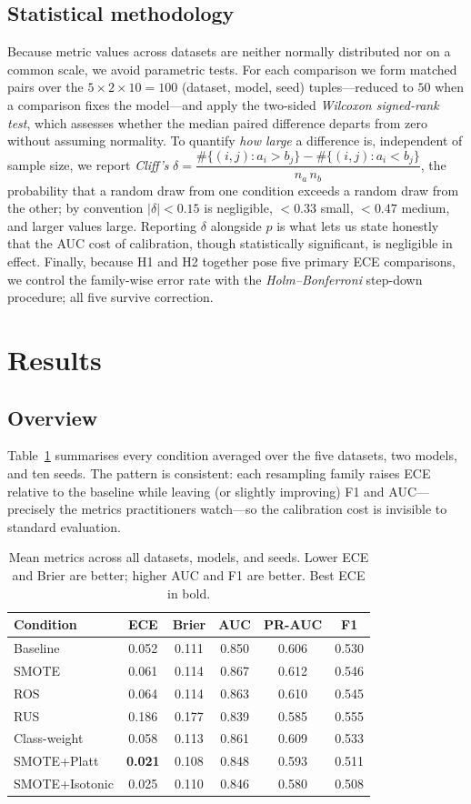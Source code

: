 \documentclass[conference]{IEEEtran}
\begin{document}
\subsection{Statistical methodology}
Because metric values across datasets are neither normally distributed
nor on a common scale, we avoid parametric tests. For each comparison we
form matched pairs over the $5\times2\times10=100$ (dataset, model, seed)
tuples---reduced to $50$ when a comparison fixes the model---and apply the
two-sided \emph{Wilcoxon signed-rank test}, which assesses whether the
median paired difference departs from zero without assuming normality. To
quantify \emph{how large} a difference is, independent of sample size, we
report \emph{Cliff's} $\delta=\dfrac{\#\{(i,j):a_i>b_j\}-\#\{(i,j):a_i<b_j\}}{n_a\,n_b}$,
the
probability that a random draw from one condition exceeds a random draw
from the other; by convention $|\delta|<0.15$ is negligible, $<0.33$
small, $<0.47$ medium, and larger values large. Reporting $\delta$
alongside $p$ is what lets us state honestly that the AUC cost of
calibration, though statistically significant, is negligible in effect.
Finally, because H1 and H2 together pose five primary ECE comparisons, we
control the family-wise error rate with the \emph{Holm--Bonferroni}
step-down procedure; all five survive correction.

\section{Results}
\subsection{Overview}
Table~\ref{tab:main} summarises every condition averaged over the five
datasets, two models, and ten seeds. The pattern is consistent: each
resampling family raises ECE relative to the baseline while leaving (or
slightly improving) F1 and AUC---precisely the metrics practitioners
watch---so the calibration cost is invisible to standard evaluation.

\begin{table}[t]
\caption{Mean metrics across all datasets, models, and seeds. Lower ECE
and Brier are better; higher AUC and F1 are better. Best ECE in bold.}
\label{tab:main}
\centering
\begin{tabular}{lccccc}
\toprule
Condition & ECE & Brier & AUC & PR-AUC & F1 \\
\midrule
Baseline & 0.052 & 0.111 & 0.850 & 0.606 & 0.530 \\
SMOTE & 0.061 & 0.114 & 0.867 & 0.612 & 0.546 \\
ROS & 0.064 & 0.114 & 0.863 & 0.610 & 0.545 \\
RUS & 0.186 & 0.177 & 0.839 & 0.585 & 0.555 \\
Class-weight & 0.058 & 0.113 & 0.861 & 0.609 & 0.533 \\
SMOTE+Platt & \textbf{0.021} & 0.108 & 0.848 & 0.593 & 0.511 \\
SMOTE+Isotonic & 0.025 & 0.110 & 0.846 & 0.580 & 0.508 \\
\bottomrule
\end{tabular}
\end{table}
\end{document}
